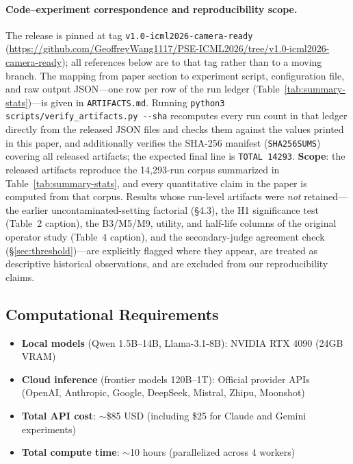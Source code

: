 \documentclass{article}
\theoremstyle{plain}
\theoremstyle{definition}
\begin{document}
\paragraph{Code--experiment correspondence and reproducibility scope.} The release is pinned at tag \texttt{v1.0-icml2026-camera-ready} (\url{https://github.com/GeoffreyWang1117/PSE-ICML2026/tree/v1.0-icml2026-camera-ready}); all references below are to that tag rather than to a moving branch. The mapping from paper section to experiment script, configuration file, and raw output JSON---one row per row of the run ledger (Table~\ref{tab:summary-stats})---is given in \texttt{ARTIFACTS.md}. Running \texttt{python3 scripts/verify\_artifacts.py -{}-sha} recomputes every run count in that ledger directly from the released JSON files and checks them against the values printed in this paper, and additionally verifies the SHA-256 manifest (\texttt{SHA256SUMS}) covering all released artifacts; the expected final line is \texttt{TOTAL 14293}. \textbf{Scope}: the released artifacts reproduce the 14{,}293-run corpus summarized in Table~\ref{tab:summary-stats}, and every quantitative claim in the paper is computed from that corpus. Results whose run-level artifacts were \emph{not} retained---the earlier uncontaminated-setting factorial (\S4.3), the H1 significance test (Table~2 caption), the B3/M5/M9, utility, and half-life columns of the original operator study (Table~4 caption), and the secondary-judge agreement check (\S\ref{sec:threshold})---are explicitly flagged where they appear, are treated as descriptive historical observations, and are excluded from our reproducibility claims.

\subsection{Computational Requirements}

\begin{itemize}
    \item \textbf{Local models} (Qwen 1.5B--14B, Llama-3.1-8B): NVIDIA RTX 4090 (24GB VRAM)
    \item \textbf{Cloud inference} (frontier models 120B--1T): Official provider APIs (OpenAI, Anthropic, Google, DeepSeek, Mistral, Zhipu, Moonshot)
    \item \textbf{Total API cost}: $\sim$\$85 USD (including \$25 for Claude and Gemini experiments)
    \item \textbf{Total compute time}: $\sim$10 hours (parallelized across 4 workers)
\end{itemize}
\end{document}
